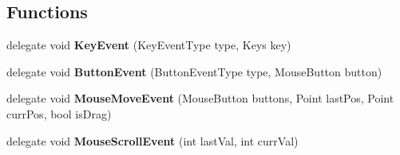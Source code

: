 \subsection*{Functions}
\begin{DoxyCompactItemize}
\item 
\mbox{\label{namespace_n_g_sim_1_1_input_ad7a23def6574e12b0d92af82ddfc6a88}} 
delegate void {\bfseries Key\+Event} (Key\+Event\+Type type, Keys key)
\item 
\mbox{\label{namespace_n_g_sim_1_1_input_aa429d47fdb796114edd69b8c8204122a}} 
delegate void {\bfseries Button\+Event} (Button\+Event\+Type type, Mouse\+Button button)
\item 
\mbox{\label{namespace_n_g_sim_1_1_input_af1eebf6c6cb558a503b0baca9984ecfc}} 
delegate void {\bfseries Mouse\+Move\+Event} (Mouse\+Button buttons, Point last\+Pos, Point curr\+Pos, bool is\+Drag)
\item 
\mbox{\label{namespace_n_g_sim_1_1_input_ae85edba8f626ac5d0ae54c414e65843b}} 
delegate void {\bfseries Mouse\+Scroll\+Event} (int last\+Val, int curr\+Val)
\end{DoxyCompactItemize}
